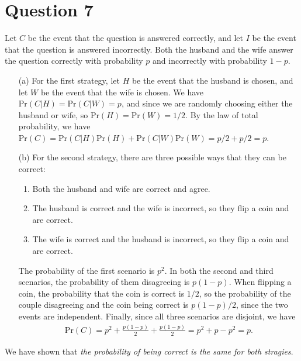\documentclass[10pt]{article}
\begin{document}
\section{Question 7} \noindent
Let \(C\) be the event that the question is answered correctly, and let \(I\) be the event that the question is answered incorrectly. 
Both the husband and the wife answer the question correctly with probability \(p\) and incorrectly with probability \(1-p\). 
\begin{itemize}
    \item[(a)] For the first strategy, let \(H\) be the event that the husband is chosen, and let \(W\) be the event that the wife is 
    chosen. We have \(\mathrm{Pr}(C | H) = \mathrm{Pr}(C | W) = p\), and since 
    we are randomly choosing either the husband or wife, so \(\mathrm{Pr}(H) = \mathrm{Pr}(W) = 1/2\). By the law of total 
    probability, we have \(\mathrm{Pr}(C) = \mathrm{Pr}(C | H) \mathrm{Pr}(H) + \mathrm{Pr}(C | W) \mathrm{Pr}(W) = p/2 + p/2 = p\).
    \item[(b)] For the second strategy, there are three possible ways that they can be correct:
    \begin{enumerate}
        \item Both the husband and wife are correct and agree.
        \item The husband is correct and the wife is incorrect, so they flip a coin and are correct.
        \item The wife is correct and the husband is incorrect, so they flip a coin and are correct.
    \end{enumerate}
    The probability of the first scenario is \(p^2\). In both the second and third scenarios, the probability of them 
    disagreeing is \(p(1-p)\). When flipping a coin, the probability that the coin is correct is \(1/2\), so the probability
    of the couple disagreeing and the coin being correct is \(p(1-p)/2\), since the two events are independent. Finally, since all three
    scenarios are disjoint, we have 
    \begin{align*}
        \mathrm{Pr}(C) = p^2 + \frac{p(1-p)}{2} + \frac{p(1-p)}{2} = p^2 + p - p^2 = p.
    \end{align*}
\end{itemize}
We have shown that \textit{the probability of being correct is the same for both stragies}. 
\end{document}

